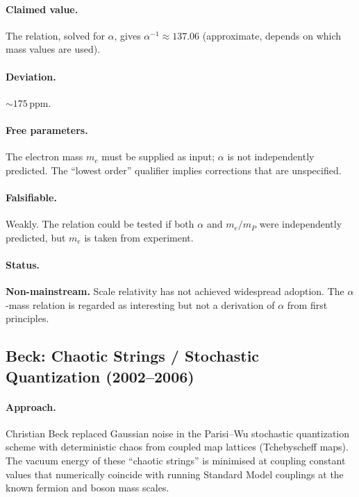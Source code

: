 \documentclass[11pt,a4paper]{article}
\begin{document}
\paragraph{Claimed value.}
The relation, solved for $\alpha$, gives $\alpha^{-1}\approx 137.06$ (approximate, depends on which mass values are used).

\paragraph{Deviation.}
$\sim 175$\,ppm.

\paragraph{Free parameters.}
The electron mass $m_e$ must be supplied as input; $\alpha$ is not independently predicted.  The ``lowest order'' qualifier implies corrections that are unspecified.

\paragraph{Falsifiable.}
Weakly.  The relation could be tested if both $\alpha$ and $m_e/m_P$ were independently predicted, but $m_e$ is taken from experiment.

\paragraph{Status.}
\textbf{Non-mainstream.}  Scale relativity has not achieved widespread adoption.  The $\alpha$-mass relation is regarded as interesting but not a derivation of $\alpha$ from first principles.

\subsection{Beck: Chaotic Strings / Stochastic Quantization (2002--2006)}\label{sec:beck}

\paragraph{Approach.}
Christian Beck replaced Gaussian noise in the Parisi--Wu stochastic quantization scheme with deterministic chaos from coupled map lattices (Tchebyscheff maps).  The vacuum energy of these ``chaotic strings'' is minimised at coupling constant values that numerically coincide with running Standard Model couplings at the known fermion and boson mass scales.
\end{document}
